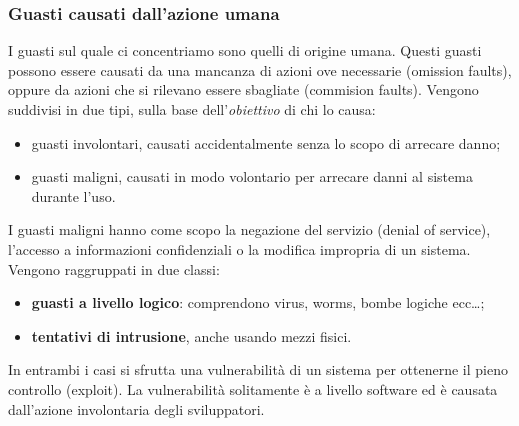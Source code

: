  \subsubsection{Guasti causati dall'azione umana}
 I guasti sul quale ci concentriamo sono quelli di origine umana. Questi guasti possono essere causati da una mancanza di 
 azioni ove necessarie (omission faults), oppure da azioni che si rilevano essere sbagliate (commision faults). Vengono
 suddivisi in due tipi, sulla base dell'\emph{obiettivo} di chi lo causa:
 \begin{itemize}
     \item guasti involontari, causati  accidentalmente senza lo scopo di arrecare danno;
     \item guasti maligni, causati in modo volontario per arrecare danni al sistema durante l'uso.
 \end{itemize}
 I guasti maligni hanno  come scopo la negazione del servizio (denial of service), l'accesso a informazioni confidenziali
 o la modifica impropria di un sistema.
 Vengono raggruppati in due classi:
 \begin{itemize}
     \item \textbf{guasti a livello logico}: comprendono virus, worms, bombe logiche ecc\dots;
     \item \textbf{tentativi di intrusione}, anche usando mezzi fisici.
 \end{itemize}
 In entrambi i casi si sfrutta una vulnerabilità di un sistema per ottenerne il pieno controllo (exploit).
 La vulnerabilità solitamente è a livello software ed è causata dall'azione involontaria degli sviluppatori.


